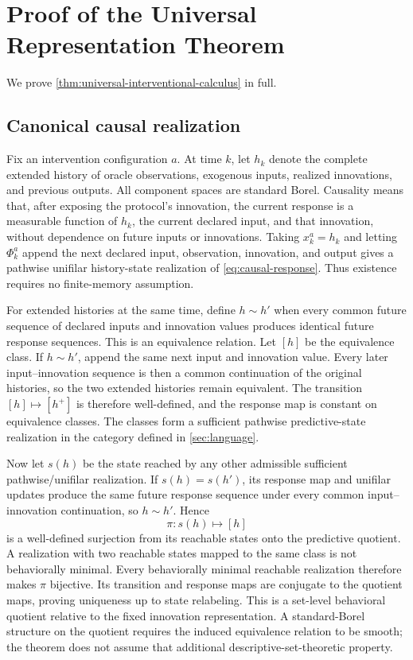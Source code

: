 \section{Proof of the Universal Representation Theorem}
\label{app:theory-strengthening}

We prove \cref{thm:universal-interventional-calculus} in full.

\subsection{Canonical causal realization}

Fix an intervention configuration $a$.  At time $k$, let $h_k$ denote the
complete extended history of oracle observations, exogenous inputs, realized
innovations, and previous outputs.  All component spaces are standard Borel.
Causality means that, after exposing the protocol's innovation, the current
response is a measurable function of $h_k$, the current declared input, and
that innovation, without dependence on future inputs or innovations.  Taking
$x_k^a=h_k$ and letting $\Phi_k^a$ append the next declared input,
observation, innovation, and output gives a pathwise unifilar history-state
realization of \cref{eq:causal-response}.  Thus existence requires no
finite-memory assumption.

For extended histories at the same time, define $h\sim h'$ when every common
future sequence of declared inputs and innovation values produces identical
future response sequences.  This is an equivalence relation.  Let $[h]$ be
the equivalence class.  If $h\sim h'$, append the same next input and
innovation value.  Every later input--innovation sequence is then a common
continuation of the original histories, so the two extended histories remain
equivalent.  The transition $[h]\mapsto[h^+]$ is therefore well-defined, and
the response map is constant on equivalence classes.  The classes form a
sufficient pathwise predictive-state realization in the category defined in
\cref{sec:language}.

Now let $s(h)$ be the state reached by any other admissible sufficient
pathwise/unifilar realization.  If $s(h)=s(h')$, its response map and
unifilar updates produce the same future response sequence under every common
input--innovation continuation, so $h\sim h'$.  Hence
\[
\pi:s(h)\longmapsto[h]
\]
is a well-defined surjection from its reachable states onto the predictive
quotient.  A realization with two reachable states mapped to the same class
is not behaviorally minimal.  Every behaviorally minimal reachable
realization therefore makes $\pi$ bijective.  Its transition and response
maps are conjugate to the quotient maps, proving uniqueness up to state
relabeling.  This is a set-level behavioral quotient relative to the fixed
innovation representation.  A standard-Borel structure on the quotient
requires the induced equivalence relation to be smooth; the theorem does not
assume that additional descriptive-set-theoretic property.

